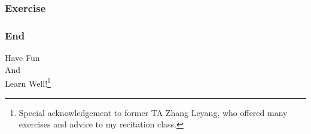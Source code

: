 \documentclass[10pt, t]{beamer}
\begin{document}
\begin{frame}
    \frametitle{Exercise}


\end{frame}

\begin{frame}
    \frametitle{End}
    \vspace{2.2cm}
    \begin{center}
        \Large
        Have Fun \\
        And \\
        Learn Well!\footnote[frame]{Special acknowledgement to former TA Zhang Leyang, who offered many exercises and advice to my recitation class.}
    \end{center}
\end{frame}
\end{document}
